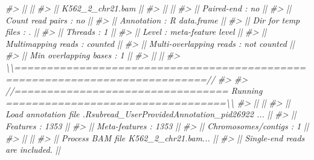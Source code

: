 \documentclass[
]{article}
\newenvironment{Shaded}{\begin{snugshade}}{\end{snugshade}}
\newcommand{\CommentTok}[1]{\textcolor[rgb]{0.56,0.35,0.01}{\textit{#1}}}
\begin{document}
\begin{Shaded}
\begin{Highlighting}[]
\CommentTok{\#\textgreater{} ||                                                                            ||}
\CommentTok{\#\textgreater{} ||                           K562\_2\_chr21.bam                                 ||}
\CommentTok{\#\textgreater{} ||                                                                            ||}
\CommentTok{\#\textgreater{} ||              Paired{-}end : no                                               ||}
\CommentTok{\#\textgreater{} ||        Count read pairs : no                                               ||}
\CommentTok{\#\textgreater{} ||              Annotation : R data.frame                                     ||}
\CommentTok{\#\textgreater{} ||      Dir for temp files : .                                                ||}
\CommentTok{\#\textgreater{} ||                 Threads : 1                                                ||}
\CommentTok{\#\textgreater{} ||                   Level : meta{-}feature level                               ||}
\CommentTok{\#\textgreater{} ||      Multimapping reads : counted                                          ||}
\CommentTok{\#\textgreater{} || Multi{-}overlapping reads : not counted                                      ||}
\CommentTok{\#\textgreater{} ||   Min overlapping bases : 1                                                ||}
\CommentTok{\#\textgreater{} ||                                                                            ||}
\CommentTok{\#\textgreater{} \textbackslash{}\textbackslash{}============================================================================//}
\CommentTok{\#\textgreater{} }
\CommentTok{\#\textgreater{} //================================= Running ==================================\textbackslash{}\textbackslash{}}
\CommentTok{\#\textgreater{} ||                                                                            ||}
\CommentTok{\#\textgreater{} || Load annotation file .Rsubread\_UserProvidedAnnotation\_pid26922 ...         ||}
\CommentTok{\#\textgreater{} ||    Features : 1353                                                         ||}
\CommentTok{\#\textgreater{} ||    Meta{-}features : 1353                                                    ||}
\CommentTok{\#\textgreater{} ||    Chromosomes/contigs : 1                                                 ||}
\CommentTok{\#\textgreater{} ||                                                                            ||}
\CommentTok{\#\textgreater{} || Process BAM file K562\_2\_chr21.bam...                                       ||}
\CommentTok{\#\textgreater{} ||    Single{-}end reads are included.                                          ||}

\end{Highlighting}
\end{Shaded}
\end{document}
